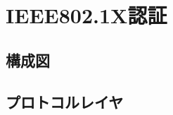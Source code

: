 \section{IEEE802.1X認証}
\toc
\subsection{構成図}
\begin{frame}{\ft}
    
\end{frame}
\subsection{プロトコルレイヤ}
\begin{frame}{\ft}
    
\end{frame}